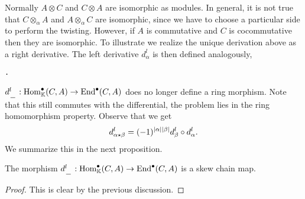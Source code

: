 \documentclass[../thesis.tex]{subfiles}
\begin{document}
            Normally $A\otimes C$ and $C\otimes A$ are isomorphic as modules. In general, it is not true that $C\otimes_\alpha A$ and $A\otimes_\alpha C$ are isomorphic, since we have to choose a particular side to perform the twisting. However, if $A$ is commutative and $C$ is cocommutative then they are isomorphic. To illustrate we realize the unique derivation above as a right derivative. The left derivative $d_\alpha^l$ is then defined analogously,
            \begin{center}
                \tt{.}
            \end{center}

            $d_{\argument}^l : \tt{Hom}_\mathbb{K}^\bullet(C,A) \rightarrow \tt{End}^\bullet(C,A)$ does no longer define a ring morphism. Note that this still commutes with the differential, the problem lies in the ring homomorphism property. Observe that we get
            \begin{align*}
                d_{\alpha\star\beta}^l = (-1)^{|\alpha||\beta|}d_\beta^l\circ d_\alpha^l\tt{.}
            \end{align*}
            We summarize this in the next proposition.

            \begin{proposition}
                The morphism $d_{\argument}^l : \tt{Hom}_\mathbb{K}^\bullet(C,A) \rightarrow \tt{End}^\bullet(C,A)$ is a skew chain map. 
            \end{proposition}

            \begin{proof}
                This is clear by the previous discussion.
            \end{proof}
\end{document}
